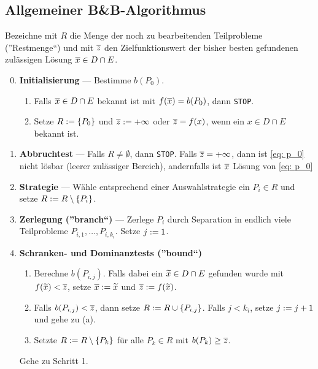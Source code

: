 \subsection{Allgemeiner B\&B-Algorithmus}
Bezeichne mit $R$ die Menge der noch zu bearbeitenden Teilprobleme (''Restmenge``) und mit $\overline{z}$ den Zielfunktionswert der bisher besten gefundenen zulässigen Lösung $\overline{x} \in D \cap E$.

\begin{enumerate}[label=\underline{\textbf{Schritt \arabic*:}}, leftmargin=*]
	\setcounter{enumi}{-1}
	\item \textbf{Initialisierung} --- Bestimme $b(P_0)$.
	\begin{enumerate}[label=(\alph*), noitemsep]
		\item Falls $\overline{x} \in D \cap E$ bekannt ist mit $f(\overline{x}) = b(P_0)$, dann \texttt{STOP}.
		\item Setze $R \mathrel{:=} \left\{ P_0 \right\}$ und $\overline{z} \mathrel{:=} + \infty$ oder $\overline{z} = f(x)$, wenn ein $x \in D \cap E$ bekannt ist.
	\end{enumerate}	
	\item \textbf{Abbruchtest} --- Falls $R \neq \emptyset$, dann \texttt{STOP}. Falls $\overline{z} = +\infty$, dann ist \eqref{eq: p_0} nicht lösbar (leerer zulässiger Bereich), andernfalls ist $\overline{x}$ Lösung von \eqref{eq: p_0}
	\item \textbf{Strategie} --- Wähle entsprechend einer Auswahlstrategie ein $P_i \in R$ und setze $R \mathrel{:=} R \setminus \left\{ P_i \right\}$.
	\item \textbf{Zerlegung (''branch``)} --- Zerlege $P_i$ durch Separation in endlich viele Teilprobleme $P_{i,1}, \dots, P_{i,k_i}$. Setze $j \mathrel{:=} 1$.
	\item \textbf{Schranken- und Dominanztests (''bound``)}
	\begin{enumerate}[label=(\alph*), noitemsep]
		\item Berechne $b(P_{i,j})$. Falls dabei ein $\widetilde{x} \in D \cap E$ gefunden wurde mit $f(\widetilde{x}) < \overline{z}$, setze $\overline{x} \mathrel{:=} \widetilde{x}$ und $\overline{z} \mathrel{:=} f(\widetilde{x})$.
		\item Falls $b(P_{i,j}) < \overline{z}$, dann setze $R \mathrel{:=} R \cup \left\{ P_{i,j} \right\}$. Falls $j < k_i$, setze $j \mathrel{:=} j + 1$ und gehe zu (a).
		\item Setzte $R \mathrel{:=} R \setminus \left\{ P_k \right\}$ für alle $P_k \in R$ mit $b(P_k) \ge \overline{z}$. 
	\end{enumerate}	
	Gehe zu Schritt 1.
\end{enumerate}

